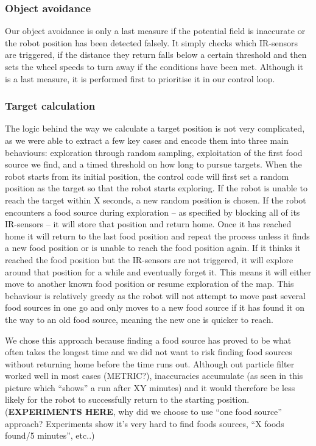 \documentclass[paper=a4, fontsize=12pt]{scrartcl}	%
\numberwithin{equation}{section}		%
\numberwithin{figure}{section}			%
\numberwithin{table}{section}				%
\begin{document}
\subsubsection{Object avoidance}
Our object avoidance is only a last measure if the potential field is inaccurate or the robot position has been detected falsely. It simply checks which IR-sensors are triggered, if the distance they return falls below a certain threshold and then sets the wheel speeds to turn away if the conditions have been met. Although it is a last measure, it is performed first to prioritise it in our control loop.
\subsubsection{Target calculation}
The logic behind the way we calculate a target position is not very complicated, as we were able to extract a few key cases and encode them into three main behaviours: exploration through random sampling, exploitation of the first food source we find, and a timed threshold on how long to pursue targets. When the robot starts from its initial position, the control code will first set a random position as the target so that the robot starts exploring. If the robot is unable to reach the target within X seconds, a new random position is chosen. If the robot encounters a food source during exploration – as specified by blocking all of its IR-sensors – it will store that position and return home. Once it has reached home it will return to the last food position and repeat the process unless it finds a new food position or is unable to reach the food position again. If it thinks it reached the food position but the IR-sensors are not triggered, it will explore around that position for a while and eventually forget it. This means it will either move to another known food position or resume exploration of the map. This behaviour is relatively greedy as the robot will not attempt to move past several food sources in one go and only moves to a new food source if it has found it on the way to an old food source, meaning the new one is quicker to reach.

We chose this approach because finding a food source has proved to be what often takes the longest time and we did not want to risk finding food sources without returning home before the time runs out. Although out particle filter worked well in most cases (METRIC?), inaccuracies accumulate (as seen in this picture which “shows” a run after XY minutes) and it would therefore be less likely for the robot to successfully return to the starting position.
(\textbf{EXPERIMENTS HERE}, why did we choose to use “one food source” approach? Experiments show it’s very hard to find foods sources, “X foods found/5 minutes”, etc..)
\end{document}
